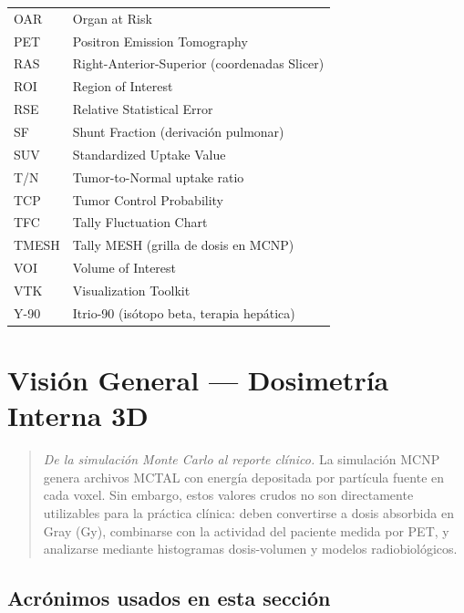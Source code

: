 \documentclass[12pt,a4paper]{article}
\begin{document}
\begin{longtable}{p{3.5cm} p{11cm}}
OAR & Organ at Risk \\
PET & Positron Emission Tomography \\
RAS & Right-Anterior-Superior (coordenadas Slicer) \\
ROI & Region of Interest \\
RSE & Relative Statistical Error \\
SF & Shunt Fraction (derivación pulmonar) \\
SUV & Standardized Uptake Value \\
T/N & Tumor-to-Normal uptake ratio \\
TCP & Tumor Control Probability \\
TFC & Tally Fluctuation Chart \\
TMESH & Tally MESH (grilla de dosis en MCNP) \\
VOI & Volume of Interest \\
VTK & Visualization Toolkit \\
Y-90 & Itrio-90 (isótopo beta, terapia hepática) \\
\end{longtable}

\newpage

\tableofcontents
\newpage

\section{Visión General --- Dosimetría Interna 3D}

\begin{quote}
\textit{De la simulación Monte Carlo al reporte clínico.} La simulación MCNP genera archivos MCTAL con energía depositada por partícula fuente en cada voxel. Sin embargo, estos valores crudos no son directamente utilizables para la práctica clínica: deben convertirse a dosis absorbida en Gray (Gy), combinarse con la actividad del paciente medida por PET, y analizarse mediante histogramas dosis-volumen y modelos radiobiológicos.
\end{quote}

\subsection*{Acrónimos usados en esta sección}
\end{document}
